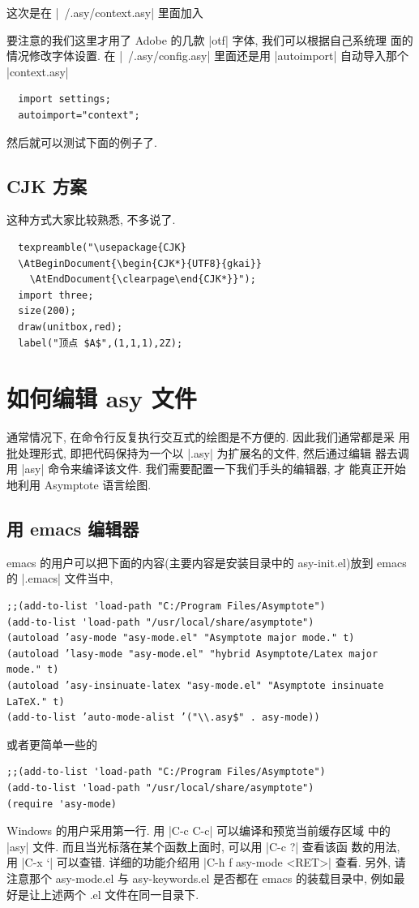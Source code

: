 \documentclass[nofonts,CJKnormalspaces]{ctexbook}[2009/05/20]
\begin{document}
这次是在 |~/.asy/context.asy| 里面加入

要注意的我们这里才用了 Adobe 的几款 |otf| 字体, 我们可以根据自己系统理
面的情况修改字体设置.
在 |~/.asy/config.asy| 里面还是用 |autoimport| 自动导入那个
|context.asy|
\begin{lstlisting}
  import settings;
  autoimport="context";
\end{lstlisting}
然后就可以测试下面的例子了.


\subsection{CJK 方案}
这种方式大家比较熟悉, 不多说了.
\begin{lstlisting}
  texpreamble("\usepackage{CJK}
  \AtBeginDocument{\begin{CJK*}{UTF8}{gkai}}
    \AtEndDocument{\clearpage\end{CJK*}}");
  import three;
  size(200);
  draw(unitbox,red);
  label("顶点 $A$",(1,1,1),2Z);
\end{lstlisting}

\section{如何编辑 asy 文件}
通常情况下, 在命令行反复执行交互式的绘图是不方便的. 因此我们通常都是采
用批处理形式, 即把代码保持为一个以 |.asy| 为扩展名的文件, 然后通过编辑
器去调用 |asy| 命令来编译该文件. 我们需要配置一下我们手头的编辑器, 才
能真正开始地利用 Asymptote 语言绘图.\label{asy:Editors}

\subsection{用 emacs 编辑器}
emacs 的用户可以把下面的内容(主要内容是安装目录中的 asy-init.el)放到 emacs
的 |.emacs| 文件当中,
\begin{verbatim}
;;(add-to-list 'load-path "C:/Program Files/Asymptote")
(add-to-list 'load-path "/usr/local/share/asymptote")
(autoload ’asy-mode "asy-mode.el" "Asymptote major mode." t)
(autoload ’lasy-mode "asy-mode.el" "hybrid Asymptote/Latex major mode." t)
(autoload ’asy-insinuate-latex "asy-mode.el" "Asymptote insinuate LaTeX." t)
(add-to-list ’auto-mode-alist ’("\\.asy$" . asy-mode))
\end{verbatim}
或者更简单一些的
\begin{verbatim}
;;(add-to-list 'load-path "C:/Program Files/Asymptote")
(add-to-list 'load-path "/usr/local/share/asymptote")
(require 'asy-mode)
\end{verbatim}
Windows 的用户采用第一行. 用 |C-c C-c| 可以编译和预览当前缓存区域
中的 |asy| 文件. 而且当光标落在某个函数上面时, 可以用 |C-c ?| 查看该函
数的用法, 用 |C-x `| 可以查错. 详细的功能介绍用 |C-h f asy-mode <RET>|
查看. 另外, 请注意那个 asy-mode.el 与 asy-keywords.el 是否都在 emacs
的装载目录中, 例如最好是让上述两个 .el 文件在同一目录下.
\end{document}
